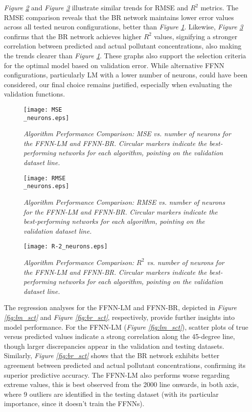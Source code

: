 \documentclass[10pt]{article}
\begin{document}
	\textit{Figure \ref{fig:comparisonRMSE}} and \textit{Figure \ref{fig:comparisonR2}} illustrate similar trends for RMSE and $R^2$ metrics. The RMSE comparison reveals that the BR network maintains lower error values across all tested neuron configurations, better than \textit{Figure \ref{fig:comparisonMSE}}. Likewise, \textit{Figure \ref{fig:comparisonR2}} confirms that the BR network achieves higher $R^2$ values, signifying a stronger correlation between predicted and actual pollutant concentrations, also making the trends clearer than \textit{Figure \ref{fig:comparisonMSE}}. These graphs also support the selection criteria for the optimal model based on validation error. While alternative FFNN configurations, particularly LM with a lower number of neurons, could have been considered, our final choice remains justified, especially when evaluating the validation functions.
	
	\begin{figure}[H]
		\centering
		\texttt{[image: MSE\\\_neurons.eps]}
		\caption{\textit{Algorithm Performance Comparison: MSE vs. number of neurons for the FFNN-LM and FFNN-BR. Circular markers indicate the best-performing networks for each algorithm, pointing on the validation dataset line.}}
		\label{fig:comparisonMSE}
	\end{figure}
	
	\begin{figure}[H]
		\centering
		\texttt{[image: RMSE\\\_neurons.eps]}
		\caption{\textit{Algorithm Performance Comparison: RMSE vs. number of neurons for the FFNN-LM and FFNN-BR. Circular markers indicate the best-performing networks for each algorithm, pointing on the validation dataset line.}}
		\label{fig:comparisonRMSE}
	\end{figure}
	
	\begin{figure}[H]
		\centering
		\texttt{[image: R-2\_neurons.eps]}
		\caption{\textit{Algorithm Performance Comparison: \(R^2\) vs. number of neurons for the FFNN-LM and FFNN-BR. Circular markers indicate the best-performing networks for each algorithm, pointing on the validation dataset line.}}
		\label{fig:comparisonR2}
	\end{figure}
	
	The regression analyses for the FFNN-LM and FFNN-BR, depicted in \textit{Figure \ref{fig:lm_sct}} and \textit{Figure \ref{fig:br_sct}}, respectively, provide further insights into model performance. For the FFNN-LM (\textit{Figure \ref{fig:lm_sct}}), scatter plots of true versus predicted values indicate a strong correlation along the 45-degree line, though larger discrepancies appear in the validation and testing datasets. Similarly, \textit{Figure \ref{fig:br_sct}} shows that the BR network exhibits better agreement between predicted and actual pollutant concentrations, confirming its superior predictive accuracy. The FFNN-LM also performs worse regarding extreme values, this is best observed from the 2000 line onwards, in both axis, where 9 outliers are identified in the testing dataset (with its particular importance, since it doesn't train the FFNNs).
	
\end{document}
